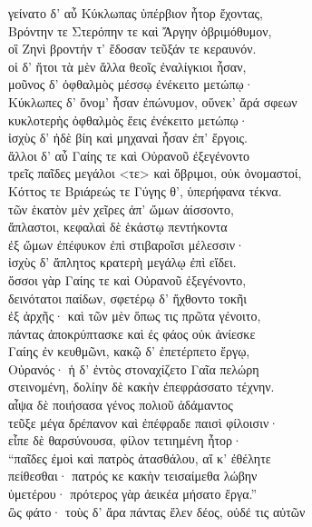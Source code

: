 \begin{pages}
\begin{Leftside}
\quad{}γείνατο δ' αὖ Κύκλωπας ὑπέρβιον ἦτορ ἔχοντας,\\
Βρόντην τε Στερόπην τε καὶ Ἄργην ὀβριμόθυμον, \\
οἳ Ζηνὶ βροντήν τ' ἔδοσαν τεῦξάν τε κεραυνόν.\\
οἱ δ' ἤτοι τὰ μὲν ἄλλα θεοῖς ἐναλίγκιοι ἦσαν,\\
μοῦνος δ' ὀφθαλμὸς μέσσῳ ἐνέκειτο μετώπῳ· \\
Κύκλωπες δ' ὄνομ' ἦσαν ἐπώνυμον, οὕνεκ' ἄρά σφεων\\
κυκλοτερὴς ὀφθαλμὸς ἕεις ἐνέκειτο μετώπῳ· \\
ἰσχὺς δ' ἠδὲ βίη καὶ μηχαναὶ ἦσαν ἐπ' ἔργοις.\\

\quad{}ἄλλοι δ' αὖ Γαίης τε καὶ Οὐρανοῦ ἐξεγένοντο\\
τρεῖς παῖδες μεγάλοι \textless{}τε\textgreater{} καὶ ὄβριμοι, οὐκ ὀνομαστοί, \\
Κόττος τε Βριάρεώς τε Γύγης θ', ὑπερήφανα τέκνα. \\
τῶν ἑκατὸν μὲν χεῖρες ἀπ' ὤμων ἀίσσοντο, \\
ἄπλαστοι, κεφαλαὶ δὲ ἑκάστῳ πεντήκοντα\\
ἐξ ὤμων ἐπέφυκον ἐπὶ στιβαροῖσι μέλεσσιν· \\
ἰσχὺς δ' ἄπλητος κρατερὴ μεγάλῳ ἐπὶ εἴδει.\\

\quad{}ὅσσοι γὰρ Γαίης τε καὶ Οὐρανοῦ ἐξεγένοντο,\\
δεινότατοι παίδων, σφετέρῳ δ' ἤχθοντο τοκῆι \\
ἐξ ἀρχῆς· καὶ τῶν μὲν ὅπως τις πρῶτα γένοιτο, \\
πάντας ἀποκρύπτασκε καὶ ἐς φάος οὐκ ἀνίεσκε\\
Γαίης ἐν κευθμῶνι, κακῷ δ' ἐπετέρπετο ἔργῳ, \\
Οὐρανός· ἡ δ' ἐντὸς στοναχίζετο Γαῖα πελώρη\\
στεινομένη, δολίην δὲ κακὴν ἐπεφράσσατο τέχνην. \\
αἶψα δὲ ποιήσασα γένος πολιοῦ ἀδάμαντος\\
τεῦξε μέγα δρέπανον καὶ ἐπέφραδε παισὶ φίλοισιν· \\

\quad{}εἶπε δὲ θαρσύνουσα, φίλον τετιημένη ἦτορ·\\
``παῖδες ἐμοὶ καὶ πατρὸς ἀτασθάλου, αἴ κ' ἐθέλητε\\
πείθεσθαι· πατρός κε κακὴν τεισαίμεθα λώβην \\
ὑμετέρου· πρότερος γὰρ ἀεικέα μήσατο ἔργα.'' \\
ὣς φάτο· τοὺς δ' ἄρα πάντας ἕλεν δέος, οὐδέ τις αὐτῶν\\


\end{Leftside}
\end{pages}
